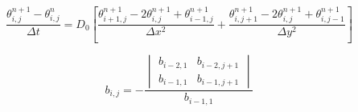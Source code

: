 \documentclass{article}
\begin{document}
\newpage

$$\frac{\theta_{i,j}^{n+1} - \theta_{i,j}^{n}}{\Delta t} = D_{0} \left[ \frac{\theta_{i+1,j}^{n+1} - 2\theta_{i,j}^{n+1} + \theta_{i-1,j}^{n+1}}{\Delta x^2} + \frac{\theta_{i,j+1}^{n+1} - 2\theta_{i,j}^{n+1} + \theta_{i,j-1}^{n+1}}{\Delta y^2} \right]$$

\newpage
\[
b_{i, j} = -\frac{\begin{vmatrix}
b_{i-2, 1} & b_{i-2, j+1} \\
b_{i-1, 1} & b_{i-1, j+1}
\end{vmatrix}}{b_{i-1, 1}}
\]
\end{document}
